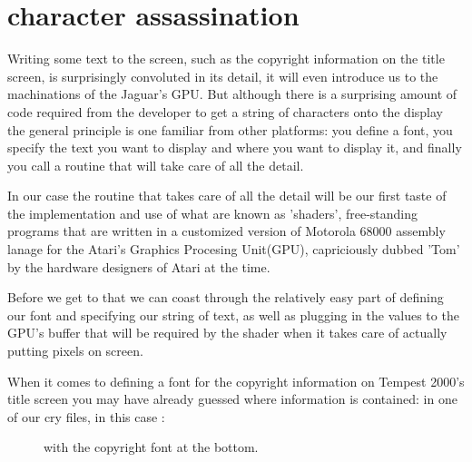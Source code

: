 \chapter{character assassination}
\lhead[tempest 2000]{}
\label{sec:listing}
\lstset{style=68KStyle}

Writing some text to the screen, such as the copyright information on the title screen, is surprisingly convoluted in its detail,
it will even introduce us to the machinations of the Jaguar's GPU. But although there is a surprising amount of code required from
the developer to get a string of characters onto the display the general principle is one familiar from other platforms: you define
a font, you specify the text you want to display and where you want to display it, and finally you call a routine that will take care of all the detail.

In our case the routine that takes care of all the detail will be our first taste of the implementation and use of what are known as 'shaders', free-standing
programs that are written in a customized version of Motorola 68000 assembly lanage for the Atari's Graphics Procesing Unit(GPU), capriciously dubbed 'Tom' by
the hardware designers of Atari at the time.

Before we get to that we can coast through the relatively easy part of defining our font and specifying our string of text, as well as plugging in the values
to the GPU's buffer that will be required by the shader when it takes care of actually putting pixels on screen.

When it comes to defining a font for the copyright information on Tempest 2000's title screen you may have already guessed where information is contained: in
one of our  cry files, in this case :

\begin{figure}[H]
    \centering
    \begin{adjustbox}{width=8cm,center}
    \end{adjustbox}
\caption{ with the copyright font at the bottom.}
\end{figure}

